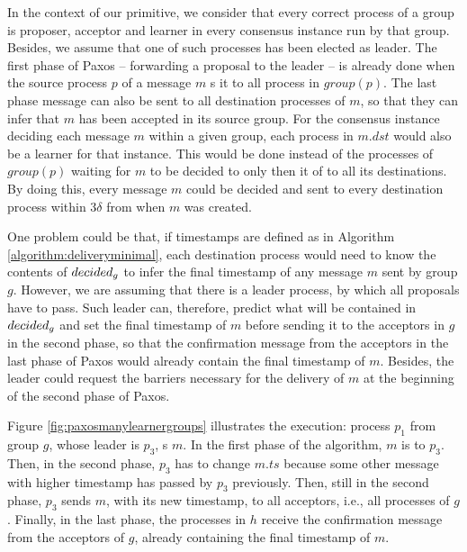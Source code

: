 \documentclass[times, 10pt]{article}
\begin{document}
In the context of our \amcast{} primitive, we consider that every correct process of a group is proposer, acceptor and learner in every consensus instance run by that group. Besides, we assume that one of such processes has been elected as leader. The first phase of Paxos -- forwarding a proposal to the leader -- is already done when the source process $p$ of a message $m$ \rmcast{}s it to all process in $group(p)$. The last phase message can also be sent to all destination processes of $m$, so that they can infer that $m$ has been accepted in its source group. For the consensus instance deciding each message $m$ within a given group, each process in $m.dst$ would also be a learner for that instance. This would be done instead of the processes of $group(p)$ waiting for $m$ to be decided to only then \rmcast{} it of to all its destinations. By doing this, every message $m$ could be decided and sent to every destination process within 3$\delta$ from when $m$ was created.

One problem could be that, if timestamps are defined as in Algorithm \ref{algorithm:deliveryminimal}, each destination process would need to know the contents of $decided\text{$_g$}$ to infer the final timestamp of any message $m$ sent by group $g$. However, we are assuming that there is a leader process, by which all proposals have to pass. Such leader can, therefore, predict what will be contained in $decided\text{$_g$}$ and set the final timestamp of $m$ before sending it to the acceptors in $g$ in the second phase, so that the confirmation message from the acceptors in the last phase of Paxos would already contain the final timestamp of $m$. Besides, the leader could request the barriers necessary for the delivery of $m$ at the beginning of the second phase of Paxos.

Figure \ref{fig:paxosmanylearnergroups} illustrates the execution: process $p_1$ from group $g$, whose leader is $p_3$, \amcast{}s $m$. In the first phase of the algorithm, $m$ is \rmcast{} to $p_3$. Then, in the second phase, $p_3$ has to change $m.ts$ because some other message with higher timestamp has passed by $p_3$ previously. Then, still in the second phase, $p_3$ sends $m$, with its new timestamp, to all acceptors, i.e., all processes of $g$. Finally, in the last phase, the processes in $h$ receive the confirmation message from the acceptors of $g$, already containing the final timestamp of $m$.

\end{document}
